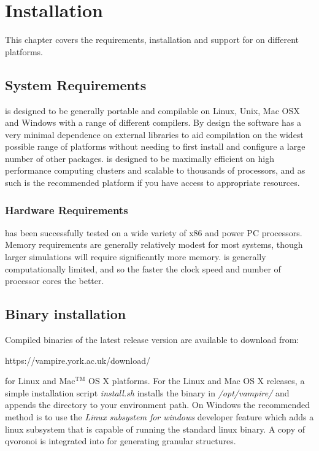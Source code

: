 \chapter{Installation}\label{chap:installation}

This chapter covers the requirements, installation and support for \vampire on different platforms.

\section*{System Requirements}
\vampire is designed to be generally portable and compilable on Linux, Unix, Mac OSX and Windows with a range of different compilers. By design the software has a very minimal dependence on external libraries to aid compilation on the widest possible range of platforms without needing to first install and configure a large number of other packages. \vampire is designed to be maximally efficient on high performance computing clusters and scalable to thousands of processors, and as such is the recommended platform if you have access to appropriate resources.

\subsection*{Hardware Requirements}
\vampire has been successfully tested on a wide variety of x86 and power PC processors. Memory requirements are generally relatively modest for most systems, though larger simulations will require significantly more memory. \vampire is generally computationally limited, and so the faster the clock speed and number of processor cores the better.

\section*{Binary installation}
Compiled binaries of the latest release version are available to download from:

\noindent
\begin{minipage}[c]{\textwidth}
\centering
https://vampire.york.ac.uk/download/
\end{minipage}

\noindent for Linux and Mac$^{\mathrm{TM}}$ OS X platforms. For the Linux and Mac OS X releases, a simple installation script \textit{install.sh} installs the binary in \textit{/opt/vampire/} and appends the directory to your environment path. On Windows the recommended method is to use the \textit{Linux subsystem for windows} developer feature which adds a linux subsystem that is capable of running the standard linux binary. A copy of qvoronoi is integrated into \vampire for generating granular structures.

